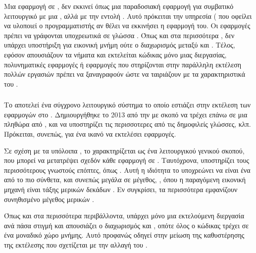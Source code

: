 Μια εφαρμογή σε , δεν εκκινεί όπως μια παραδοσιακή
εφαρμογή για συμβατικό λειτουργικό με μια , αλλά με
την εντολή . Αυτό πρόκειται την υπηρεσία
( που οφείλει να υλοποιεί ο προγραμματιστής αν θέλει
να εκκινήσει η εφαρμογή του. Οι εφαρμογές πρέπει να γράφονται
υποχρεωτικά σε γλώσσα . Όπως και στα περισσότερα
, δεν υπάρχει υποστήριξη για εικονική
μνήμη ούτε ο διαχωρισμός μεταξύ  και .
Τέλος, εφόσον απουσιάζουν τα νήματα και εκτελείται
κώδικας μόνο μιας διεργασίας, πολυνηματικές εφαρμογές ή εφαρμογές
που στηρίζονται στην παράλληλη εκτέλεση πολλών εργασιών
πρέπει να ξαναγραφούν ώστε να ταιριάζουν με τα
χαρακτηριστικά του \cite{Charalampos}.

\subsubsection{}

Το  αποτελεί ένα σύγχρονο λειτουργικό σύστημα το οποίο
εστιάζει στην εκτέλεση των εφαρμογών στο .
Δημιουργήθηκε το 2013 από την  με σκοπό
να τρέχει επάνω σε μια πληθώρα από , και να
υποστηρίζει τις περισσοτερες από τις δημοφιλείς γλώσσες,
 κλπ. Πρόκειται, συνεπώς, για
ένα  ικανό να εκτελέσει  
εφαρμογές\cite{Orestis}.
\newline

Σε σχέση με τα υπόλοιπα , το 
χαρακτηρίζεται ως ένα λειτουργικού γενικού σκοπού, που
μπορεί να μετατρέψει σχεδόν κάθε εφαρμογή σε .
Ταυτόχρονα, υποστηρίζει τους περισσότερους γνωστούς
επόπτες, όπως . Αυτή η ιδιότητα το
υποχρεώνει να είναι ένα από το πιο σύνθετα, και συνεπώς
μεγάλα σε μέγεθος, , όπου η παραγόμενη εικονική
μηχανή είναι τάξης μερικών δεκάδων . Εν συγκρίσει, τα περισσότερα
 εμφανίζουν συνηθισμένο μέγεθος μερικών \cite{Orestis}.
\newline

Όπως και στα περισσότερα  περιβάλλοντα, υπάρχει
μόνο μια εκτελούμενη διεργασία ανά πάσα στιγμή και
απουσιάζει ο διαχωρισμός  και ,
οπότε όλος ο κώδικας τρέχει σε ένα μοναδικό χώρο μνήμης.
Αυτό προφανώς οδηγεί στην μείωση της καθυστέρησης της
εκτέλεσης που σχετίζεται με την αλλαγή του .
\newline

